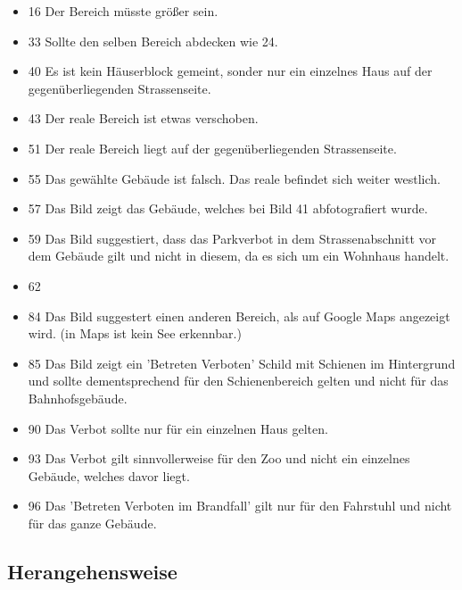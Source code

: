 \begin{itemize}
\item 16 Der Bereich müsste größer sein.
\item 33 Sollte den selben Bereich abdecken wie 24.
\item 40 Es ist kein Häuserblock gemeint, sonder nur ein einzelnes Haus auf der gegenüberliegenden Strassenseite.
\item 43 Der reale Bereich ist etwas verschoben.
\item 51 Der reale Bereich liegt auf der gegenüberliegenden Strassenseite.
\item 55 Das gewählte Gebäude ist falsch. Das reale befindet sich weiter westlich.
\item 57 Das Bild zeigt das Gebäude, welches bei Bild 41 abfotografiert wurde.
\item 59 Das Bild suggestiert, dass das Parkverbot in dem Strassenabschnitt vor dem Gebäude gilt und nicht in diesem, da es sich um ein Wohnhaus handelt.
\item 62
\item 84 Das Bild suggestert einen anderen Bereich, als auf Google Maps angezeigt wird. (in Maps ist kein See erkennbar.)
\item 85 Das Bild zeigt ein 'Betreten Verboten' Schild mit Schienen im Hintergrund und sollte dementsprechend für den Schienenbereich gelten und nicht für das Bahnhofsgebäude.
\item 90 Das Verbot sollte nur für ein einzelnen Haus gelten.
\item 93 Das Verbot gilt sinnvollerweise für den Zoo und nicht ein einzelnes Gebäude, welches davor liegt.
\item 96 Das 'Betreten Verboten im Brandfall' gilt nur für den Fahrstuhl und nicht für das ganze Gebäude.
\end{itemize}

\subsection{Herangehensweise}
